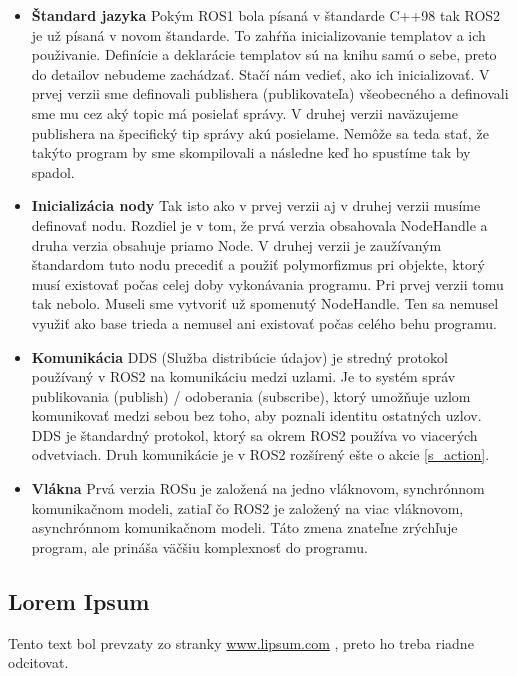 \begin{itemize}
	\item \textbf{Štandard jazyka} \newline
		Pokým ROS1 bola písaná v štandarde C++98 tak ROS2 je už písaná v novom štandarde. To zahŕňa inicializovanie templatov a ich použivanie. Definície
		a deklarácie templatov sú na knihu samú o sebe, preto do detailov nebudeme zachádzať. Stačí nám vedieť, ako ich inicializovať. V prvej verzii
		sme definovali publishera (publikovateľa) všeobecného a definovali sme mu cez aký topic má posielať správy. V druhej verzii naväzujeme publishera
		na špecifický tip správy akú posielame. Nemôže sa teda stať, že takýto program by sme skompilovali a následne keď ho spustíme tak by spadol.

	\item \textbf{Inicializácia nody} \newline
		Tak isto ako v prvej verzii aj v druhej verzii musíme definovať nodu. Rozdiel je v tom, že prvá verzia obsahovala NodeHandle a druha verzia obsahuje priamo Node.
		V druhej verzii je zaužívaným štandardom tuto nodu precediť a použiť polymorfizmus pri objekte, ktorý musí existovať počas celej doby vykonávania programu. Pri
		prvej verzii tomu tak nebolo. Museli sme vytvoriť už spomenutý NodeHandle. Ten sa nemusel využiť ako base trieda a nemusel ani existovať počas celého behu programu.

	\item \textbf{Komunikácia} \newline
		DDS (Služba distribúcie údajov) je stredný protokol používaný v ROS2 na komunikáciu medzi uzlami. Je to systém správ
		publikovania (publish) / odoberania (subscribe), ktorý umožňuje uzlom komunikovať medzi sebou bez toho, aby poznali identitu ostatných uzlov. DDS je
		štandardný protokol, ktorý sa okrem ROS2 používa vo viacerých odvetviach. \cite{chatgpt} Druh komunikácie je v ROS2 rozšírený ešte o akcie \ref{s_action}.

	\item \textbf{Vlákna} \newline
		Prvá verzia ROSu je založená na jedno vláknovom, synchrónnom komunikačnom modeli, zatiaľ čo ROS2 je založený na viac vláknovom, asynchrónnom
		komunikačnom modeli. Táto zmena znateľne zrýchľuje program, ale prináša väčšiu komplexnosť do programu.

\end{itemize}

\subsection{Lorem Ipsum}
Tento text bol prevzaty zo stranky \url{www.lipsum.com} \cite{lipsum}, preto ho treba riadne odcitovat.

